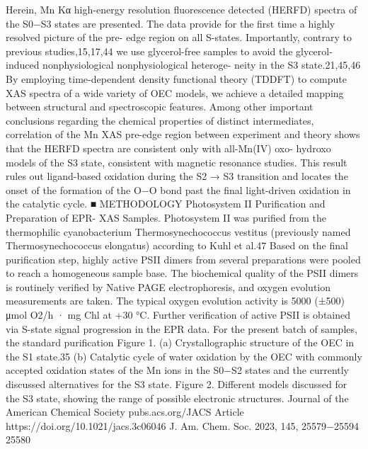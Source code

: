\documentclass{article}
\begin{document}
Herein, Mn Kα high-energy resolution fluorescence detected
(HERFD) spectra of the S0−S3 states are presented. The data
provide for the first time a highly resolved picture of the pre-
edge region on all S-states. Importantly, contrary to previous
studies,15,17,44 we use glycerol-free samples to avoid the
glycerol-induced nonphysiological nonphysiological heteroge-
neity in the S3 state.21,45,46 By employing time-dependent
density functional theory (TDDFT) to compute XAS spectra
of a wide variety of OEC models, we achieve a detailed
mapping between structural and spectroscopic features.
Among other important conclusions regarding the chemical
properties of distinct intermediates, correlation of the Mn XAS
pre-edge region between experiment and theory shows that the
HERFD spectra are consistent only with all-Mn(IV) oxo-
hydroxo models of the S3 state, consistent with magnetic
resonance studies. This result rules out ligand-based oxidation
during the S2 → S3 transition and locates the onset of the
formation of the O−O bond past the final light-driven
oxidation in the catalytic cycle.
■ METHODOLOGY
Photosystem II Purification and Preparation of EPR-
XAS Samples. Photosystem II was purified from the
thermophilic cyanobacterium Thermosynechococcus vestitus
(previously named Thermosynechococcus elongatus) according
to Kuhl et al.47 Based on the final purification step, highly
active PSII dimers from several preparations were pooled to
reach a homogeneous sample base. The biochemical quality of
the PSII dimers is routinely verified by Native PAGE
electrophoresis, and oxygen evolution measurements are
taken. The typical oxygen evolution activity is 5000 (±500)
μmol O2/h · mg Chl at +30 °C. Further verification of active
PSII is obtained via S-state signal progression in the EPR data.
For the present batch of samples, the standard purification
Figure 1. (a) Crystallographic structure of the OEC in the S1 state.35 (b) Catalytic cycle of water oxidation by the OEC with commonly accepted
oxidation states of the Mn ions in the S0−S2 states and the currently discussed alternatives for the S3 state.
Figure 2. Different models discussed for the S3 state, showing the
range of possible electronic structures.
Journal of the American Chemical Society
pubs.acs.org/JACS
Article
https://doi.org/10.1021/jacs.3c06046
J. Am. Chem. Soc. 2023, 145, 25579−25594
25580

\newpage

\end{document}
